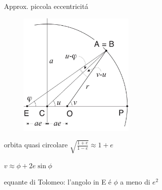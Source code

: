 \begin{frame}{Approx. piccola eccentricit\'a}

\begin{figure}[!ht]

\includegraphics[width=0.5\textwidth]{tolomeo}

\end{figure}


\end{frame}

\begin{wordonframe}{orbita quasi circolare}
$\sqrt{\frac{1+e}{1-e}}\approx1+e$

$v\approx\phi+2e\sin{\phi}$

equante di Tolomeo: l'angolo in E \'e $\phi$ a meno di $e^2$

\end{wordonframe}
